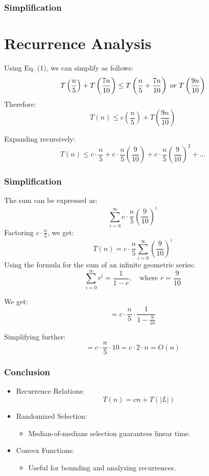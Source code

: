 \begin{frame}
    \frametitle{Simplification}
    \section*{Recurrence Analysis}
    \vspace{0.3cm}
        Using Eq. (1), we can simplify as follows:
        \[
        T\left(\frac{n}{5}\right) + T\left(\frac{7n}{10}\right) \leq  T\left(\frac{n}{5} + \frac{7n}{10}\right) \hspace{0.1cm} or \hspace{0.1cm} T\left(\frac{9n}{10}\right) 
        \]
        Therefore:
        \[
        T(n) \leq c\left(\frac{n}{5}\right) + T\left(\frac{9n}{10}\right) 
        \]

        Expanding recursively:
        \[
        T(n) \leq c \cdot \frac{n}{5} + c \cdot \frac{n}{5} \left(\frac{9}{10}\right) + c \cdot \frac{n}{5} \left(\frac{9}{10}\right)^2 + \dots
        \]

        
\end{frame}
\begin{frame}
 \frametitle{Simplification}
The sum can be expressed as:
        \[
        \sum_{i=0}^{\infty} c \cdot \frac{n}{5} \left(\frac{9}{10}\right)^i
        \]
        Factoring \( c \cdot \frac{n}{5} \), we get:
        \[
        T(n) = c \cdot \frac{n}{5} \sum_{i=0}^{\infty} \left(\frac{9}{10}\right)^i
        \]
Using the formula for the sum of an infinite geometric series:
\[
\sum_{i=0}^{\infty} r^i = \frac{1}{1-r}, \quad \text{where } r = \frac{9}{10}
\]

We get:
\[
= c \cdot \frac{n}{5} \cdot \frac{1}{1 - \frac{9}{10}}
\]

Simplifying further:
\[
= c \cdot \frac{n}{5} \cdot 10 = c \cdot 2 \cdot n = O(n)
\]

\end{frame}




\begin{frame}
    \frametitle{Conclusion}
    \begin{itemize}
        \item Recurrence Relations:
        \[
        T(n) = cn + T(|L|)
        \]
        \item Randomized Selection:
        \begin{itemize}
            \item Median-of-medians selection guarantees linear time.
        \end{itemize}
        \item Convex Functions:
        \begin{itemize}
            \item Useful for bounding and analyzing recurrences.
        \end{itemize}
    \end{itemize}
\end{frame}







